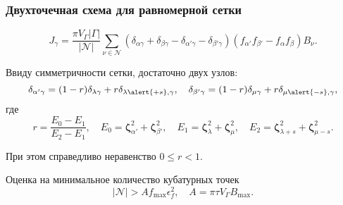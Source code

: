 \documentclass[mathserif]{beamer} %
\newcommand{\bzeta}{\boldsymbol{\zeta}}
\newcommand{\Nu}{\mathcal{N}}
\begin{document}
\begin{frame}
    \frametitle{Двухточечная схема для равномерной сетки}
    \begin{equation}\label{eq:discrete_symm_ci_uniform}
        J_\gamma = \frac{\pi V_\Gamma|\Gamma|}{|\Nu|}
            \sum_{\nu\in\Nu} \left(
                \delta_{\alpha\gamma} + \delta_{\beta\gamma}
                - \delta_{\alpha'\gamma} - \delta_{\beta'\gamma}
            \right)\left( f_{\alpha'} f_{\beta'} - f_{\alpha} f_{\beta} \right)B_\nu.
    \end{equation}
    \vspace{-20pt}\pause

    Ввиду симметричности сетки, достаточно двух узлов:
    \begin{equation}\label{eq:uniform_projection}
        \delta_{\alpha'\gamma} = (1-r)\delta_{\lambda\gamma} + r\delta_{\lambda\alert{+s},\gamma}, \quad
        \delta_{\beta'\gamma} = (1-r)\delta_{\mu\gamma} + r\delta_{\mu\alert{-s},\gamma},
    \end{equation}
    где
    \begin{equation}\label{eq:r_uniform}
        r = \frac{E_0-E_1}{E_2-E_1}, \quad
        E_0 = \bzeta_{\alpha'}^2 + \bzeta_{\beta'}^2, \quad
        E_1 = \bzeta_{\lambda}^2 + \bzeta_{\mu}^2, \quad
        E_2 = \bzeta_{\lambda+s}^2 + \bzeta_{\mu-s}^2.
    \end{equation}
    \vspace{-20pt}\pause

    При этом справедливо неравенство \(0\leq r < 1\).

    Оценка на минимальное количество кубатурных точек
    \begin{equation}\label{eq:positive_f_uniform}
       |\Nu| > A f_{\max} \epsilon_f^2, \quad A = \pi \tau V_\Gamma B_{\max}.
    \end{equation}
\end{frame}
\end{document}
